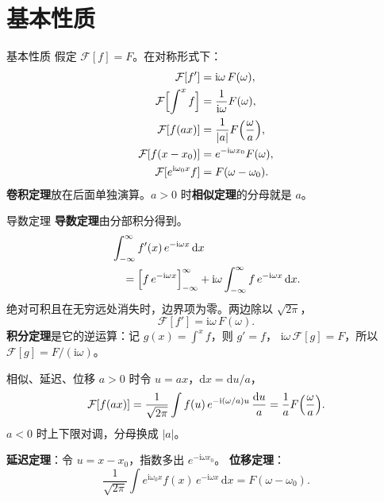 \documentclass[fontset=windows, chinese, 10pt, xcolor=dvipsnames]{beamer}
\begin{document}
\section{基本性质}

\begin{frame}{基本性质}
  假定 $\mathcal{F}[f]=F$。在对称形式下：
  \begin{align*}
    \mathcal{F}[f']&=\mathrm{i}\omega\,F(\omega),\\
    \mathcal{F}\Bigl[\int^{x} f\Bigr]
      &=\frac{1}{\mathrm{i}\omega}F(\omega),\\
    \mathcal{F}[f(ax)]
      &=\frac{1}{|a|}F\Bigl(\frac{\omega}{a}\Bigr),\\
    \mathcal{F}[f(x-x_0)]
      &=e^{-\mathrm{i}\omega x_0}F(\omega),\\
    \mathcal{F}[e^{\mathrm{i}\omega_0 x}f]
      &=F(\omega-\omega_0).
  \end{align*}
  \textbf{卷积定理}放在后面单独演算。$a>0$ 时\textbf{相似定理}的分母就是 $a$。
\end{frame}

\begin{frame}{导数定理}
  \textbf{导数定理}由分部积分得到。
  \begin{align*}
    &\int_{-\infty}^{\infty} f'(x)\,e^{-\mathrm{i}\omega x}\,\mathrm{d}x \\
    &\quad=\Bigl[f\,e^{-\mathrm{i}\omega x}\Bigr]_{-\infty}^{\infty}
      +\mathrm{i}\omega\int_{-\infty}^{\infty}
        f\,e^{-\mathrm{i}\omega x}\,\mathrm{d}x.
  \end{align*}
  绝对可积且在无穷远处消失时，边界项为零。两边除以 $\sqrt{2\pi}$，
  \begin{equation*}
    \mathcal{F}[f']=\mathrm{i}\omega\,F(\omega).
  \end{equation*}
  \textbf{积分定理}是它的逆运算：记 $g(x)=\int^{x} f$，则 $g'=f$，
  $\mathrm{i}\omega\,\mathcal{F}[g]=F$，所以 $\mathcal{F}[g]=F/(\mathrm{i}\omega)$。
\end{frame}

\begin{frame}{相似、延迟、位移}
  $a>0$ 时令 $u=ax$，$\mathrm{d}x=\mathrm{d}u/a$，
  \begin{equation*}
    \mathcal{F}[f(ax)]
    =\frac{1}{\sqrt{2\pi}}\int f(u)\,
      e^{-\mathrm{i}(\omega/a)u}\,\frac{\mathrm{d}u}{a}
    =\frac{1}{a}F\Bigl(\frac{\omega}{a}\Bigr).
  \end{equation*}
  $a<0$ 时上下限对调，分母换成 $|a|$。
  \vspace{0.3em}

  \textbf{延迟定理}：令 $u=x-x_0$，指数多出 $e^{-\mathrm{i}\omega x_0}$。
  \textbf{位移定理}：
  \begin{equation*}
    \frac{1}{\sqrt{2\pi}}\int
      e^{\mathrm{i}\omega_0 x}f(x)\,e^{-\mathrm{i}\omega x}\,\mathrm{d}x
    =F(\omega-\omega_0).
  \end{equation*}
\end{frame}
\end{document}
